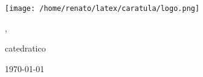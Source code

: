 \begin{titlepage} 
	\centering
	\texttt{[image: /home/renato/latex/caratula/logo.png]}\par\vspace{1cm}
	{\scshape\LARGE \universidad \par}
	\vspace{1cm}
	{\scshape\Large \curso \par}
	\vspace{1.5cm}
	{\huge\bfseries \titulo \par}
	\vspace{2cm}
	{\Large \nombre , \carnet \par}
	\vfill
	catedratico\par
	\catedratico

	\vfill

	{\large \today\par}
\end{titlepage}

